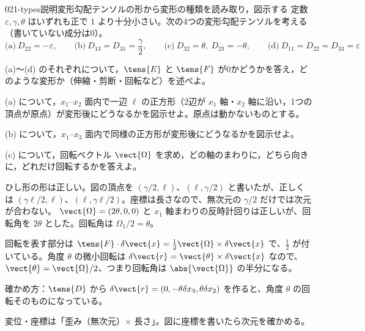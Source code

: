 \documentclass[uplatex,dvipdfmx,a4paper,11pt]{jsarticle}
\begin{document}
\begin{mondai}{021-types}{説明}{変形勾配テンソルの形から変形の種類を読み取り，図示する}
定数 $\varepsilon,\gamma,\theta$ はいずれも正で $1$ より十分小さい。次の4つの変形勾配テンソルを考える（書いていない成分は0）。
  \[ \text{(a)}\ D_{22}=-\varepsilon,\qquad \text{(b)}\ D_{13}=D_{31}=\frac{\gamma}{2},\qquad \text{(c)}\ D_{32}=\theta,\ D_{23}=-\theta,\qquad \text{(d)}\ D_{11}=D_{22}=D_{33}=\varepsilon \]
  \begin{shoumon}
    \item (a)〜(d) のそれぞれについて，$\tens{E}$ と $\tens{F}$ が0かどうかを答え，どのような変形か（伸縮・剪断・回転など）を述べよ。
    \item (a) について，$x_1$--$x_2$ 面内で一辺 $\ell$ の正方形（2辺が $x_1$ 軸・$x_2$ 軸に沿い，1つの頂点が原点）が変形後にどうなるかを図示せよ。原点は動かないものとする。
    \item (b) について，$x_1$--$x_3$ 面内で同様の正方形が変形後にどうなるかを図示せよ。
    \item (c) について，回転ベクトル $\vect{\Omega}$ を求め，どの軸のまわりに，どちら向きに，どれだけ回転するかを答えよ。
  \end{shoumon}

\begin{kotaeran}
   ひし形の形は正しい。図の頂点を $(\gamma/2,\ell)$、$(\ell,\gamma/2)$ と書いたが、正しくは $(\gamma\ell/2,\ell)$、$(\ell,\gamma\ell/2)$。座標は長さなので、無次元の $\gamma/2$ だけでは次元が合わない。
   $\vect{\Omega}=(2\theta,0,0)$ と $x_{1}$ 軸まわりの反時計回りは正しいが、回転角を $2\theta$ とした。回転角は $\Omega_{1}/2=\theta$。
\end{kotaeran}
\begin{rikai}
  \item 回転を表す部分は $\tens{F}\cdot\delta\vect{x}=\frac{1}{2}\vect{\Omega}\times\delta\vect{x}$ で、$\frac{1}{2}$ が付いている。角度 $\theta$ の微小回転は $\delta\vect{r}=\vect{\theta}\times\delta\vect{x}$ なので、$\vect{\theta}=\vect{\Omega}/2$、つまり回転角は $\abs{\vect{\Omega}}$ の半分になる。
  \item 確かめ方：$\tens{D}$ から $\delta\vect{r}=(0,-\theta\delta x_{3},\theta\delta x_{2})$ を作ると、角度 $\theta$ の回転そのものになっている。
  \item 変位・座標は「歪み（無次元）$\times$ 長さ」。図に座標を書いたら次元を確かめる。
\end{rikai}
\end{mondai}
\end{document}
